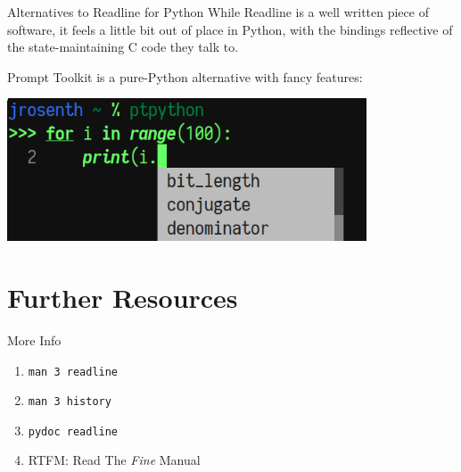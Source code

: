 \documentclass[aspectratio=1610]{beamer}
\begin{document}
\begin{frame}{Alternatives to Readline for Python}
    While Readline is a well written piece of software, it feels a little bit
    out of place in Python, with the bindings reflective of the
    state-maintaining C code they talk to.

    Prompt Toolkit is a pure-Python alternative with fancy features:

    \begin{center}
        \includegraphics[width=0.8\textwidth]{graphics/ptpython.png}
    \end{center}
\end{frame}

\section{Further Resources}

\begin{frame}{More Info}
    \begin{enumerate}
        \item \texttt{man 3 readline}
        \item \texttt{man 3 history}
        \item \texttt{pydoc readline}
        \item RTFM: Read The \emph{Fine} Manual
    \end{enumerate}
\end{frame}

{
\begin{frame}

    \begin{center}
        \Huge\headingfont
        \color{white}{Questions?}
    \end{center}

\end{frame}
}
\end{document}
